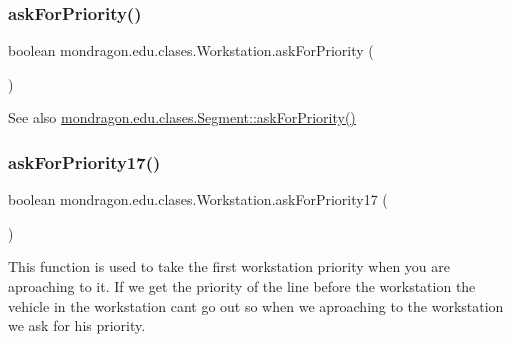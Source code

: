 \subsubsection{\texorpdfstring{askForPriority()}{askForPriority()}}
{\footnotesize\ttfamily boolean mondragon.\+edu.\+clases.\+Workstation.\+ask\+For\+Priority (\begin{DoxyParamCaption}{ }\end{DoxyParamCaption})\hspace{0.3cm}{\ttfamily [inline]}}

\begin{DoxySeeAlso}{See also}
\mbox{\hyperlink{classmondragon_1_1edu_1_1clases_1_1_segment_a0ee7818c127f5117a723b8fece868030}{mondragon.\+edu.\+clases.\+Segment\+::ask\+For\+Priority()}} 
\end{DoxySeeAlso}
\mbox{\label{classmondragon_1_1edu_1_1clases_1_1_workstation_a49feeeb5cefa0f0e49792170d8821c51}} 
\subsubsection{\texorpdfstring{askForPriority17()}{askForPriority17()}}
{\footnotesize\ttfamily boolean mondragon.\+edu.\+clases.\+Workstation.\+ask\+For\+Priority17 (\begin{DoxyParamCaption}{ }\end{DoxyParamCaption})\hspace{0.3cm}{\ttfamily [inline]}}

This function is used to take the first workstation priority when you are aproaching to it. If we get the priority of the line before the workstation the vehicle in the workstation cant go out so when we aproaching to the workstation we ask for his priority.

